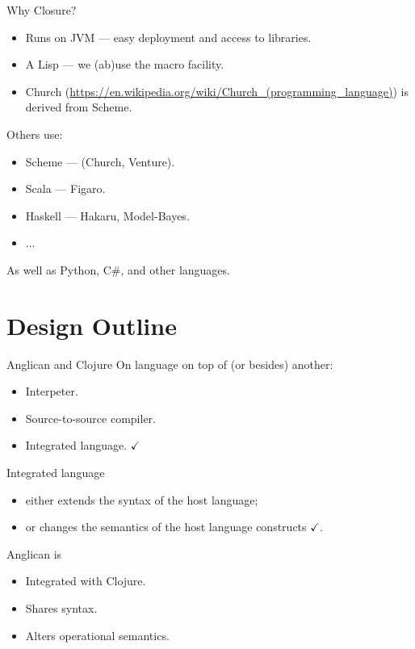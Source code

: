 \documentclass{beamer}
\begin{document}
\begin{frame}{Why Closure?}
\begin{itemize}
    \item Runs on JVM --- easy deployment and access to libraries.
        \pause
    \item A Lisp --- we (ab)use the macro facility.
        \pause
    \item Church (\url{https://en.wikipedia.org/wiki/Church_(programming_language)}) is derived from Scheme.
\end{itemize}
\pause
Others use:
    \begin{itemize}
        \item Scheme --- (Church, Venture).
        \item Scala --- Figaro.
        \item Haskell --- Hakaru, Model-Bayes.
        \item ...
    \end{itemize}
    \pause
    As well as Python, C\#,  and other languages.
\end{frame}

\section{Design Outline}

\begin{frame}{Anglican and Clojure}
    On language on top of (or besides) another:
    \begin{itemize}
        \item Interpeter.
        \item Source-to-source compiler.
        \item Integrated language. $\checkmark$
    \end{itemize}
    \pause
    \bigskip
    Integrated language
    \begin{itemize}
        \item either extends the syntax of the host language;
        \item or changes the semantics of the host language
            constructs $\checkmark$.
    \end{itemize}
    \pause
    \bigskip
    Anglican is 
    \begin{itemize}
        \item Integrated with Clojure.
        \item Shares syntax.
        \item Alters operational semantics.
    \end{itemize}
\end{frame}
\end{document}
